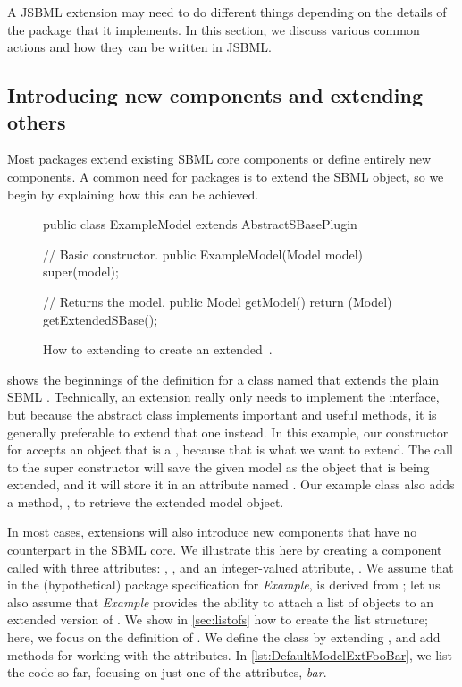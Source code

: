 A JSBML extension may need to do different things depending on the details
of the \SBMLthree package that it implements.  In this section, we discuss
various common actions and how they can be written in JSBML.


\subsection{Introducing new components and extending others}
\label{subsec:addingClasses}

Most \SBMLthree packages extend existing SBML core components or define
entirely new components.  A common need for packages is to extend the SBML
\Model object, so we begin by explaining how this can be achieved.

\begin{figure}[t]
  \begin{example}[numbers=left]
public class ExampleModel extends AbstractSBasePlugin {

  // Basic constructor.
  public ExampleModel(Model model) {
    super(model);
  }

  // Returns the model.
  public Model getModel() {
    return (Model) getExtendedSBase();
  }
}\end{example}
  \caption{How to extending \AbstractSBasePlugin to create an extended
    \,\Model.}
  \label{lst:ModelExtClass}
\end{figure}

 shows the beginnings of the definition for
a class named  that extends the plain SBML
\Model. Technically, an extension really only needs to implement the
\SBasePlugin interface, but because the abstract class \AbstractSBasePlugin
implements important and useful methods, it is generally preferable to
extend that one instead.  In this example, our constructor for
 accepts an object that is a \Model, because that is
what we want to extend.  The call to the super constructor will save the
given model as the \SBase object that is being extended, and it will store
it in an attribute named . Our example
 class also adds a method, , to
retrieve the extended model object.

In most cases, extensions will also introduce new components that have no
counterpart in the SBML core.  We illustrate this here by creating a
component called  with three attributes: , ,
and an integer-valued attribute, .  We assume that in the
(hypothetical) package specification for \emph{Example},  is
derived from \SBase; let us also assume that \emph{Example} provides the
ability to attach a list of  objects to an extended version of
\Model.  We show in \vref{sec:listofs} how to create the list
structure; here, we focus on the definition of .  We define the
class  by extending \AbstractSBasePlugin, and add methods for
working with the attributes.  In \vref{lst:DefaultModelExtFooBar},
we list the code so far, focusing on just one of the attributes,
\emph{bar}.

